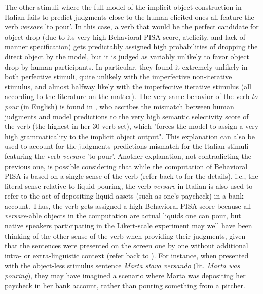 The other stimuli where the full model of the implicit object construction in Italian fails to predict judgments close to the human-elicited ones all feature the verb \textit{versare} 'to pour'. In this case, a verb that would be the perfect candidate for object drop (due to its very high Behavioral PISA score, atelicity, and lack of manner specification) gets predictably assigned high probabilities of dropping the direct object by the model, but it is judged as variably unlikely to favor object drop by human participants. In particular, they found it extremely unlikely in both perfective stimuli, quite unlikely with the imperfective non-iterative stimulus, and almost halfway likely with the imperfective iterative stimulus (all according to the literature on the matter). The very same behavior of the verb \textit{to pour} (in English) is found in \textcite[148]{Medina2007}, who ascribes the mismatch between human judgments and model predictions to the very high semantic selectivity score of the verb (the highest in her 30-verb set), which "forces the model to assign a very high grammaticality to the implicit object output". This explanation can also be used to account for the judgments-predictions mismatch for the Italian stimuli featuring the verb \textit{versare} 'to pour'. Another explanation, not contradicting the previous one, is possible considering that while the computation of Behavioral PISA is based on a single sense of the verb (refer back to  for the details), i.e., the literal sense relative to liquid pouring, the verb \textit{versare} in Italian is also used to refer to the act of depositing liquid assets (such as one's paycheck) in a bank account. Thus, the verb gets assigned a high Behavioral PISA score because all \textit{versare}-able objects in the computation are actual liquids one can pour, but native speakers participating in the Likert-scale experiment may well have been thinking of the other sense of the verb when providing their judgments, given that the sentences were presented on the screen one by one without additional intra- or extra-linguistic context (refer back to ). For instance, when presented with the object-less stimulus sentence \textit{Marta stava versando} (lit. \textit{Marta was pouring}), they may have imagined a scenario where Marta was depositing her paycheck in her bank account, rather than pouring something from a pitcher.
